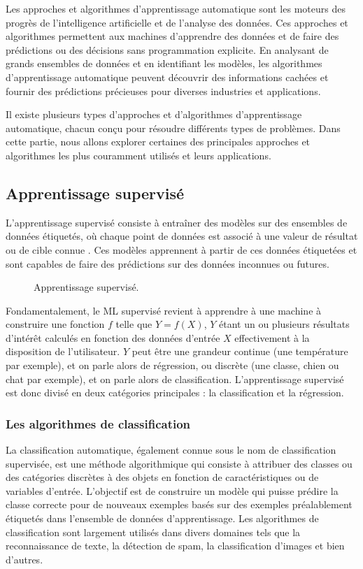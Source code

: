 Les approches et algorithmes d'apprentissage automatique sont les moteurs des progrès de l'intelligence artificielle et de l'analyse des données. Ces approches et algorithmes permettent aux machines d'apprendre des données et de faire des prédictions ou des décisions sans programmation explicite. En analysant de grands ensembles de données et en identifiant les modèles, les algorithmes d'apprentissage automatique peuvent découvrir des informations cachées et fournir des prédictions précieuses pour diverses industries et applications.

Il existe plusieurs types d'approches et d'algorithmes d'apprentissage automatique, chacun conçu pour résoudre différents types de problèmes. Dans cette partie, nous allons explorer certaines des principales approches et algorithmes les plus couramment utilisés et leurs applications.

\subsection{Apprentissage supervisé}
L'apprentissage supervisé consiste à entraîner des modèles sur des ensembles de données étiquetés, où chaque point de données est associé à une valeur de résultat ou de cible connue \cite{mohri2012}. Ces modèles apprennent à partir de ces données étiquetées et sont capables de faire des prédictions sur des données inconnues ou futures. 
\begin{figure}[H]%
    \center%
    \setlength{\fboxsep}{5pt}%
    \setlength{\fboxrule}{0.5pt}%
    \caption{Apprentissage supervisé.}%
\end{figure}
Fondamentalement, le ML supervisé revient à apprendre à une machine à construire une fonction \( f \) telle que \( Y = f(X) \), \( Y \) étant un ou plusieurs résultats d'intérêt calculés en fonction des données d'entrée \( X \) effectivement à la disposition de l'utilisateur. \( Y \) peut être une grandeur continue (une température par exemple), et on parle alors de régression, ou discrète (une classe, chien ou chat par exemple), et on parle alors de classification. L'apprentissage supervisé est donc divisé en deux catégories principales : la classification et la régression.

\subsubsection{Les algorithmes de classification}
La classification automatique, également connue sous le nom de classification supervisée, est une méthode algorithmique qui consiste à attribuer des classes ou des catégories discrètes à des objets en fonction de caractéristiques ou de variables d'entrée. L'objectif est de construire un modèle qui puisse prédire la classe correcte pour de nouveaux exemples basés sur des exemples préalablement étiquetés dans l'ensemble de données d'apprentissage. Les algorithmes de classification sont largement utilisés dans divers domaines tels que la reconnaissance de texte, la détection de spam, la classification d'images et bien d'autres.

